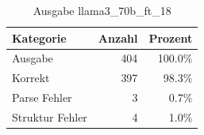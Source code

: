 
\begin{table}[!ht]
\centering
\begin{tabular}{lrr}
\toprule
\textbf{Kategorie} & \textbf{Anzahl} & \textbf{Prozent} \\
\midrule
Ausgabe & 404 & 100.0\% \\
Korrekt & 397 & 98.3\% \\
Parse Fehler & 3 & 0.7\% \\
Struktur Fehler & 4 & 1.0\% \\
\bottomrule
\end{tabular}
\caption{Ausgabe llama3_70b_ft_18}
\label{tab:file_counts}
\end{table}
    